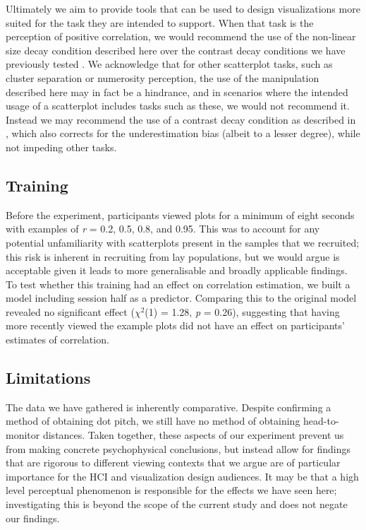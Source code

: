 \documentclass{vgtc}                          %
\begin{document}
Ultimately we aim to provide tools that can be used to design visualizations more suited for the task
they are intended to support. When that task is the perception of positive correlation, we would
recommend the use of the non-linear size decay condition described here over the contrast
decay conditions we have previously tested \cite{strain_2023}. We acknowledge that
for other scatterplot tasks, such as cluster separation or numerosity perception,
the use of the manipulation described here may in fact be a hindrance, and in scenarios
where the intended usage of a scatterplot includes tasks such as these, we would not
recommend it. Instead we may recommend the use of a contrast decay condition as described
in \cite{strain_2023}, which also corrects for the underestimation bias (albeit to a
lesser degree), while not impeding other tasks.

\hypertarget{training}{%
\subsection{Training}\label{training}}

Before the experiment, participants viewed plots for a minimum of
eight seconds with examples of \emph{r} = 0.2, 0.5, 0.8, and 0.95. This was to account
for any potential unfamiliarity with scatterplots present in the samples
that we recruited; this risk is inherent in recruiting from lay populations, but we
would argue is acceptable given it leads to more generalisable and broadly
applicable findings. To test whether this training had an effect on correlation estimation,
we built a model including session half as a predictor. Comparing this
to the original model revealed no significant effect (\(\chi^2\)(1)
= 1.28, \emph{p} = 0.26),
suggesting that having more recently viewed the example plots did not have an effect
on participants' estimates of correlation.

\hypertarget{limitations}{%
\subsection{Limitations}\label{limitations}}

The data we have gathered is inherently comparative.
Despite confirming a method of obtaining dot pitch, we still have no method of obtaining
head-to-monitor distances. Taken together, these aspects of our experiment prevent us
from making concrete psychophysical conclusions,
but instead allow for findings that are rigorous to different viewing contexts
that we argue are of particular importance for the HCI and visualization design audiences. It
may be that a high level perceptual phenomenon is responsible for the effects
we have seen here; investigating this is beyond the scope of the current study and
does not negate our findings.
\end{document}
